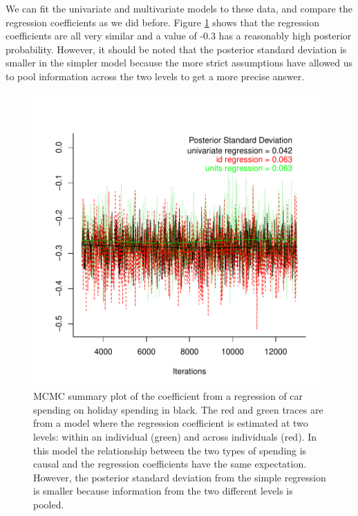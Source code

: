 \documentclass{article}
\begin{document}
\begin{Schunk}
\end{Schunk}

We can fit the univariate and multivariate models to these data, and compare the regression coefficients as we did before. Figure \ref{MVvUV2-fig} shows that the regression coefficients are all very similar and a value of -0.3 has a reasonably high posterior probability. However, it should be noted that the posterior standard deviation is smaller in the simpler model because the more strict assumptions have allowed us to pool information across the two levels to get a more precise answer.   


\iftalk
\else
\fi
\begin{figure}[!h]
\begin{center}
\includegraphics{Lecture5-016}
\end{center}
\caption{MCMC summary plot of the coefficient from a regression of car spending on holiday spending in black. The red and green traces are from a model where the regression coefficient is estimated at two levels: within an individual (green) and across individuals (red). In this model the relationship between the two types of spending is causal and the regression coefficients have the same expectation. However, the posterior standard deviation from the simple regression is smaller because information from the two different levels is pooled.}
\label{MVvUV2-fig}
\end{figure}
\end{document}
